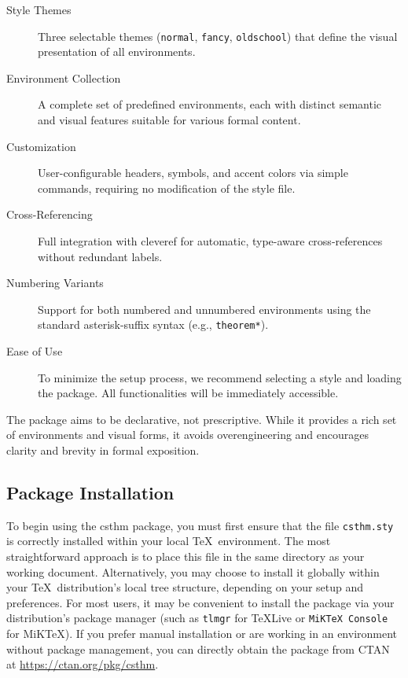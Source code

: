 \documentclass[10pt,letterpaper]{amsart}
\begin{document}
\begin{description}
	\item[Style Themes] Three selectable themes (\texttt{normal}, \texttt{fancy},
	      \texttt{oldschool}) that define the visual presentation of all environments.
	\item[Environment Collection] A complete set of predefined environments, each with
	      distinct semantic and visual features suitable for various formal content.
	\item[Customization] User-configurable headers, symbols, and accent colors via simple
	      commands, requiring no modification of the style file.
	\item[Cross-Referencing] Full integration with \textsf{cleveref} for automatic,
	      type-aware cross-references without redundant labels.
	\item[Numbering Variants] Support for both numbered and unnumbered environments using
	      the standard asterisk-suffix syntax (e.g., \texttt{theorem*}).
	\item[Ease of Use] To minimize the setup process, we recommend selecting a style and
	      loading the package. All functionalities will be immediately accessible.
\end{description}

The package aims to be declarative, not prescriptive. While it provides a rich
set of environments and visual forms, it avoids overengineering and encourages
clarity and brevity in formal exposition.

\subsection{Package Installation}

To begin using the \textsf{csthm} package, you must first ensure that the file
\texttt{csthm.sty} is correctly installed within your local \TeX\ environment.
The most straightforward approach is to place this file in the same directory
as your working document. Alternatively, you may choose to install it globally
within your \TeX\ distribution's local tree structure, depending on your setup
and preferences. For most users, it may be convenient to install the package
via your distribution's package manager (such as \texttt{tlmgr} for \TeX Live
or \texttt{MiK\TeX\ Console} for MiK\TeX). If you prefer manual installation or
are working in an environment without package management, you can directly
obtain the package from CTAN at \url{https://ctan.org/pkg/csthm}.
\end{document}
